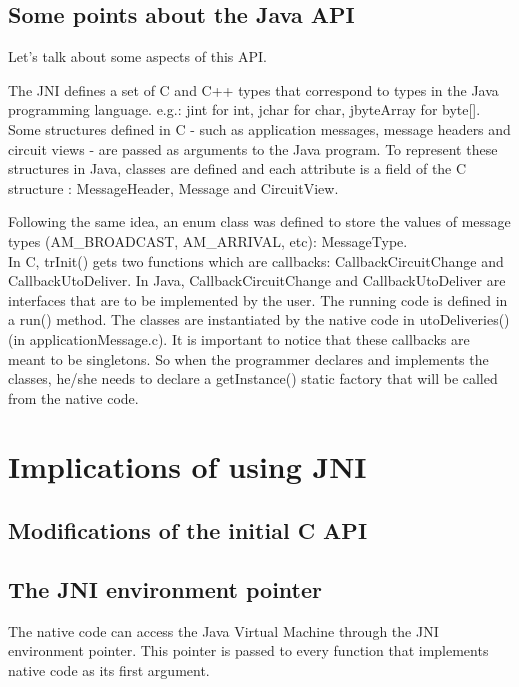 \documentclass[a4paper,10pt]{report}
\begin{document}
\subsection{Some points about the Java API}

Let's talk about some aspects of this API.

The JNI defines a set of C and C++ types that correspond to types in the Java programming language.
e.g.: jint for int, jchar for char, jbyteArray for byte[].
Some structures defined in C - such as application messages, message headers and circuit views - are passed as arguments to the Java 
program. To represent these structures in Java, classes are defined and each attribute is a field of the C structure : MessageHeader, 
Message and CircuitView.

Following the same idea, an enum class was defined to store the values of message types (AM\_BROADCAST, AM\_ARRIVAL, etc): MessageType.\\

In C, trInit() gets two functions which are callbacks: CallbackCircuitChange and CallbackUtoDeliver.
In Java, CallbackCircuitChange and CallbackUtoDeliver are interfaces that are to be implemented by the user. The running code
is defined in a run() method. The classes are instantiated by the native code in utoDeliveries() (in applicationMessage.c).
It is important to notice that these callbacks are meant to be singletons. So when the programmer
declares and implements the classes, he/she needs to declare a getInstance() static factory that will be called from the native code.

\section{Implications of using JNI}

\subsection{Modifications of the initial C API}

\subsection{The JNI environment pointer}

The native code can access the Java Virtual Machine through the JNI environment pointer. This pointer is passed to every function that
implements native code as its first argument.\\
\end{document}
